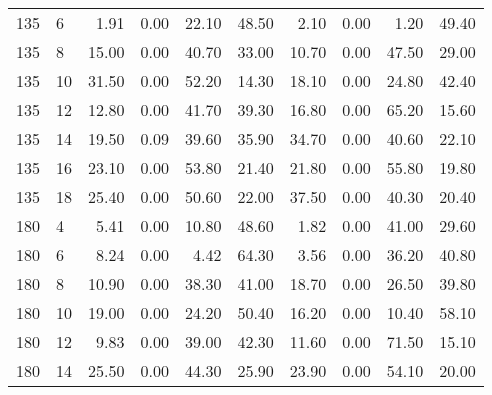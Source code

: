 \begin{table*}[h]
\begin{center}
\begin{tabular} {l l | r r r r | r r r r }
135  &             6   &  1.91   &            0.00             &               22.10  &  48.50  &  2.10   &            0.00             &               1.20   &  49.40  \\
135  &             8   &  15.00  &            0.00             &               40.70  &  33.00  &  10.70  &            0.00             &               47.50  &  29.00  \\
135  &             10  &  31.50  &            0.00             &               52.20  &  14.30  &  18.10  &            0.00             &               24.80  &  42.40  \\
135  &             12  &  12.80  &            0.00             &               41.70  &  39.30  &  16.80  &            0.00             &               65.20  &  15.60  \\
135  &             14  &  19.50  &            0.09             &               39.60  &  35.90  &  34.70  &            0.00             &               40.60  &  22.10  \\
135  &             16  &  23.10  &            0.00             &               53.80  &  21.40  &  21.80  &            0.00             &               55.80  &  19.80  \\
135  &             18  &  25.40  &            0.00             &               50.60  &  22.00  &  37.50  &            0.00             &               40.30  &  20.40  \\
180  &             4   &  5.41   &            0.00             &               10.80  &  48.60  &  1.82   &            0.00             &               41.00  &  29.60  \\
180  &             6   &  8.24   &            0.00             &               4.42   &  64.30  &  3.56   &            0.00             &               36.20  &  40.80  \\
180  &             8   &  10.90  &            0.00             &               38.30  &  41.00  &  18.70  &            0.00             &               26.50  &  39.80  \\
180  &             10  &  19.00  &            0.00             &               24.20  &  50.40  &  16.20  &            0.00             &               10.40  &  58.10  \\
180  &             12  &  9.83   &            0.00             &               39.00  &  42.30  &  11.60  &            0.00             &               71.50  &  15.10  \\
180  &             14  &  25.50  &            0.00             &               44.30  &  25.90  &  23.90  &            0.00             &               54.10  &  20.00  \\

\end{tabular}
\end{center}
\end{table*}
